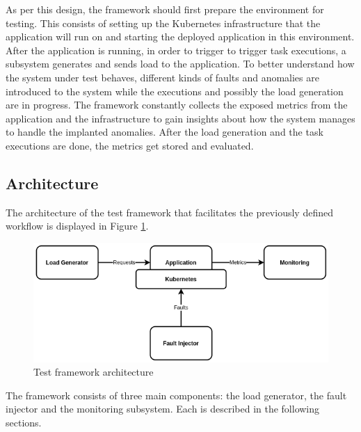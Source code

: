 As per this design, the framework should first prepare the environment for testing. This consists of setting up the Kubernetes infrastructure that the application will run on and starting the deployed application in this environment. After the application is running, in order to trigger to trigger task executions, a subsystem generates and sends load to the application. To better understand how the system under test behaves, different kinds of faults and anomalies are introduced to the system while the executions and possibly the load generation are in progress. The framework constantly collects the exposed metrics from the application and the infrastructure to gain insights about how the system manages to handle the implanted anomalies. After the load generation and the task executions are done, the metrics get stored and evaluated.

\subsection{Architecture}

The architecture of the test framework that facilitates the previously defined workflow is displayed in Figure \ref{fig:test_framework_arch}.

\begin{figure}[h]
	\centering
	\includegraphics[width=140mm, keepaspectratio]{figures/test_framework_arch.png}
	\caption{Test framework architecture}
	\label{fig:test_framework_arch}
\end{figure}

The framework consists of three main components: the load generator, the fault injector and the monitoring subsystem. Each is described in the following sections.




